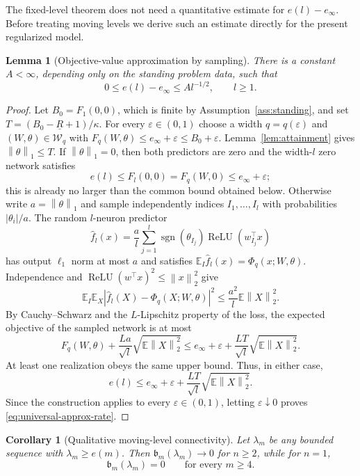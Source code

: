 \documentclass[pdflatex,sn-mathphys-num]{sn-jnl}
\theoremstyle{thmstyleone}
\newtheorem{lemma}[theorem]{Lemma}
\newtheorem{corollary}[theorem]{Corollary}
\theoremstyle{thmstyletwo}
\theoremstyle{thmstylethree}
\newcommand{\relu}{\operatorname{ReLU}}
\newcommand{\E}{\mathbb{E}}
\newcommand{\norm}[1]{\left\lVert #1 \right\rVert}
\newcommand{\abs}[1]{\left\lvert #1 \right\rvert}
\newcommand{\SubBar}{\mathfrak b}
\begin{document}
The fixed-level theorem does not need a quantitative estimate for $e(l)-e_\infty$. Before treating moving levels we derive such an estimate directly for the present regularized model.

\begin{lemma}[Objective-value approximation by sampling]\label{lem:maurey}
There is a constant $A<\infty$, depending only on the standing problem data, such that
\begin{equation}
0\le e(l)-e_\infty\le A l^{-1/2},
\qquad l\ge1.
\label{eq:universal-approx-rate}
\end{equation}
\end{lemma}

\begin{proof}
Let $B_0=F_1(0,0)$, which is finite by Assumption~\ref{ass:standing}, and set $T=(B_0-\underline R+1)/\kappa$. For every $\varepsilon\in(0,1)$ choose a width $q=q(\varepsilon)$ and $(W,\theta)\in\mathcal W_q$ with
$F_q(W,\theta)\le e_\infty+\varepsilon\le B_0+\varepsilon$. Lemma~\ref{lem:attainment} gives $\norm{\theta}_1\le T$. If $\norm{\theta}_1=0$, then both predictors are zero and the width-$l$ zero network satisfies
\[
e(l)\le F_l(0,0)=F_q(W,0)\le e_\infty+\varepsilon;
\]
this is already no larger than the common bound obtained below. Otherwise write $a=\norm{\theta}_1$ and sample independently indices $I_1,\ldots,I_l$ with probabilities $\abs{\theta_i}/a$. The random $l$-neuron predictor
\[
\widehat f_l(x)=\frac{a}{l}\sum_{j=1}^l
\operatorname{sgn}(\theta_{I_j})\relu(w_{I_j}^\top x)
\]
has output $\ell_1$ norm at most $a$ and satisfies $\E_I\widehat f_l(x)=\Phi_q(x;W,\theta)$. Independence and $\relu(w^\top x)^2\le\norm{x}_2^2$ give
\[
\E_I\E_X\abs{\widehat f_l(X)-\Phi_q(X;W,\theta)}^2
\le \frac{a^2}{l}\E\norm{X}_2^2.
\]
By Cauchy--Schwarz and the $L$-Lipschitz property of the loss, the expected objective of the sampled network is at most
\[
F_q(W,\theta)+\frac{La}{\sqrt l}\sqrt{\E\norm{X}_2^2}
\le e_\infty+\varepsilon+
\frac{LT}{\sqrt l}\sqrt{\E\norm{X}_2^2}.
\]
At least one realization obeys the same upper bound. Thus, in either case,
\[
e(l)\le e_\infty+\varepsilon+
\frac{LT}{\sqrt l}\sqrt{\E\norm{X}_2^2}.
\]
Since the construction applies to every $\varepsilon\in(0,1)$, letting $\varepsilon\downarrow0$ proves \eqref{eq:universal-approx-rate}.
\end{proof}

\begin{corollary}[Qualitative moving-level connectivity]\label{cor:qualitative}
Let $\lambda_m$ be any bounded sequence with $\lambda_m\ge e(m)$. Then $\SubBar_m(\lambda_m)\to0$ for $n\ge2$, while for $n=1$,
\[
\SubBar_m(\lambda_m)=0
\qquad\text{for every }m\ge4.
\]
\end{corollary}
\end{document}
